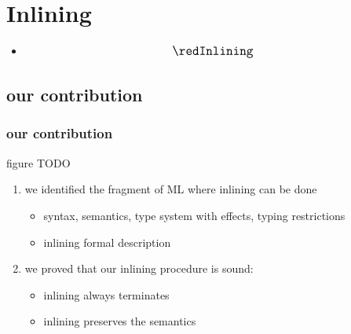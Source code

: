 \section*{Inlining}
\begin{frame}
 \begin{itemize}
 	\item[] $${\large \red \texttt{Inlining}}$$
 	\begin{center}
 	\end{center} 
 \end{itemize}
\end{frame}
\addtocounter{framenumber}{-1}

\subsection*{our contribution}
\begin{frame}[fragile]
\frametitle{our contribution}

figure TODO \\
\bigskip
\begin{enumerate}
\item we identified the fragment of ML where inlining can be done
\begin{itemize}
\item syntax, semantics, type system with effects, typing restrictions
\item inlining formal description
\end{itemize} 
\item we proved that our inlining procedure is sound:
\begin{itemize}
\item inlining always terminates
\item inlining preserves the semantics
\end{itemize}
\end{enumerate}
\end{frame}





